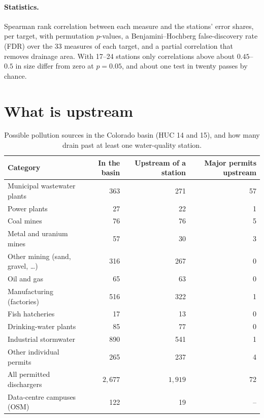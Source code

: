 \documentclass[11pt]{article}
\begin{document}
\paragraph{Statistics.} Spearman rank correlation between each measure and the stations' error
shares, per target, with permutation $p$-values, a Benjamini--Hochberg false-discovery rate (FDR)
over the 33 measures of each target, and a partial correlation that removes drainage area. With
17--24 stations only correlations above about $0.45$--$0.5$ in size differ from zero at $p=0.05$,
and about one test in twenty passes by chance.

\section{What is upstream}\label{sec:sources}

\begin{table}[H]
\centering
\small
\caption{Possible pollution sources in the Colorado basin (HUC 14 and 15), and how many drain past
at least one water-quality station.}
\label{tab:sources}
\begin{tabular}{l rrr}
\toprule
Category & In the basin & Upstream of a station & Major permits upstream \\
\midrule
Municipal wastewater plants       & 363 & 271 & 57 \\
Power plants                      &  27 &  22 &  1 \\
Coal mines                        &  76 &  76 &  5 \\
Metal and uranium mines           &  57 &  30 &  3 \\
Other mining (sand, gravel, \ldots) & 316 & 267 &  0 \\
Oil and gas                       &  65 &  63 &  0 \\
Manufacturing (factories)         & 516 & 322 &  1 \\
Fish hatcheries                   &  17 &  13 &  0 \\
Drinking-water plants             &  85 &  77 &  0 \\
Industrial stormwater             & 890 & 541 &  1 \\
Other individual permits          & 265 & 237 &  4 \\
\midrule
All permitted dischargers         & $2{,}677$ & $1{,}919$ & 72 \\
Data-centre campuses (OSM)        & 122 &  19 &  -- \\
\bottomrule
\end{tabular}
\end{table}
\end{document}

